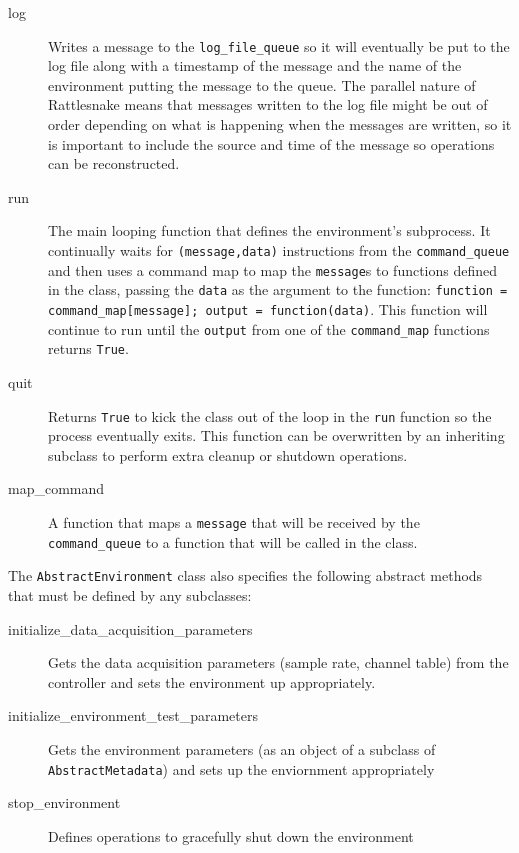 \documentclass[pdf,12pt,report]{SANDreport}
\newcommand{\inlineCode}{\lstinline[basicstyle=\bfseries\ttfamily]}
\begin{document}
    \begin{description}
    \item[log] Writes a message to the \inlineCode{log_file_queue} so it will eventually be put to the log file along with a timestamp of the message and the name of the environment putting the message to the queue.  The parallel nature of Rattlesnake means that messages written to the log file might be out of order depending on what is happening when the messages are written, so it is important to include the source and time of the message so operations can be reconstructed.
    \item[run] The main looping function that defines the environment's subprocess.  It continually waits for \inlineCode{(message,data)} instructions from the \inlineCode{command_queue} and then uses a command map to map the \inlineCode{message}s to functions defined in the class, passing the \inlineCode{data} as the argument to the function: \inlineCode{function = command_map[message]; output = function(data)}.  This function will continue to run until the \inlineCode{output} from one of the \inlineCode{command_map} functions returns \inlineCode{True}.
    \item[quit] Returns \inlineCode{True} to kick the class out of the loop in the \inlineCode{run} function so the process eventually exits.  This function can be overwritten by an inheriting subclass to perform extra cleanup or shutdown operations.
    \item[map\_command] A function that maps a \inlineCode{message} that will be received by the \inlineCode{command_queue} to a function that will be called in the class.
    \end{description}
    
    The \inlineCode{AbstractEnvironment} class also specifies the following abstract methods that must be defined by any subclasses:
    
    \begin{description}
    \item[initialize\_data\_acquisition\_parameters] Gets the data acquisition parameters (sample rate, channel table) from the controller and sets the environment up appropriately.
    \item[initialize\_environment\_test\_parameters] Gets the environment parameters (as an object of a subclass of \inlineCode{AbstractMetadata}) and sets up the enviornment appropriately
    \item[stop\_environment] Defines operations to gracefully shut down the environment
    \end{description}    
    
\end{document}
